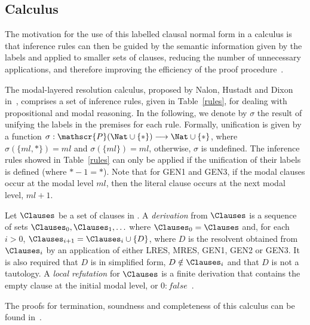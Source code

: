 \begin{example}
    
\end{example}

\subsection{Calculus}

The motivation for the use of this labelled clausal normal form in a calculus is
that inference rules can then be guided by the semantic information given by the
labels and applied to smaller sets of clauses, reducing the number of
unnecessary applications, and therefore improving the efficiency of the proof
procedure~\cite{Nalon2016}. 

The modal-layered resolution calculus, proposed by Nalon, Hustadt and Dixon
in~\cite{nalon2015modal}, comprises a set of inference rules, given in
Table~\ref{rules}, for dealing with propositional and modal reasoning. In the
following, we denote by $\sigma$ the result of unifying the labels in the
premises for each rule.  Formally, unification is given by a function $ \sigma :
\mathscr{P}(\Nat \cup \{*\}) \longrightarrow \Nat \cup \{*\}$, where $\sigma
(\{ml, *\}) = ml$ and $\sigma (\{ml\}) = ml$, otherwise, $\sigma$ is undefined.
The inference rules showed in Table~\ref{rules} can only be applied if the
unification of their labels is defined (where $* - 1 = *$). Note that for GEN1
and GEN3, if the modal clauses occur at the modal level $ml$, then the literal
clause occurs at the next modal level, $ml + 1$.

\begin{definition}
    Let $\Clauses$ be a set of clauses in . A \emph{derivation} from
    $\Clauses$ is a sequence of sets $\Clauses_0, \Clauses_1, \ldots$ where
    $\Clauses_0 = \Clauses$ and, for each $i > 0$, $\Clauses_{i+1} = \Clauses_i
    \cup \{D\}$, where $D$ is the resolvent obtained from $\Clauses_i$ by an
    application of either LRES, MRES, GEN1, GEN2 or GEN3. It is also required
    that $D$ is in simplified form, $D \notin \Clauses_i$ and that $D$ is not a
    tautology. A \emph{local refutation} for $\Clauses$ is a finite derivation
    that contains the empty clause at the initial modal level, or $0:
    false$~\cite{nalon2015modal}.
\end{definition}

The proofs for termination, soundness and completeness of this calculus can be
found in~\cite{nalon2015modal}.

